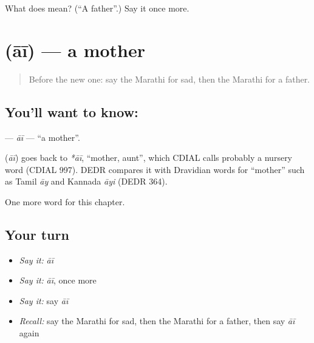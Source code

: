 \begin{tcolorbox}[breakable,colback=teal!4,colframe=teal!35!black,title={Before you move on}]
What does  mean? (\textquotedblleft{}A father\textquotedblright{}.) Say it once more.
\end{tcolorbox}
\section[\texorpdfstring{\mr{आई} (āī)}{आई (āī)}]{ (āī) — a mother}

\label{lesson:MR-C74-ai}



\begin{quote}
Before the new one: say the Marathi for sad, then the Marathi for a father.
\end{quote}

\subsection*{You'll want to know: }
\textbf{} — \emph{āī} — \textquotedblleft{}a mother\textquotedblright{}.

\begin{cousinweb}
\textbf{} (\emph{āī}) goes back to \emph{*āī}, \textquotedblleft{}mother, aunt\textquotedblright{}, which CDIAL calls probably a nursery word (CDIAL 997). DEDR compares it with Dravidian words for \textquotedblleft{}mother\textquotedblright{} such as Tamil \emph{āy} and Kannada \emph{āyi} (DEDR 364).
\end{cousinweb}

\begin{grammarlens}[title={What you've built}]
One more word for this chapter.
\end{grammarlens}

\subsection*{Your turn}
\begin{itemize}
\raggedright
  \item \emph{Say it:} \emph{āī}
  \item \emph{Say it:} \emph{āī}, once more
  \item \emph{Say it:} say \emph{āī}
  \item \emph{Recall:} say the Marathi for sad, then the Marathi for a father, then say \emph{āī} again
\end{itemize}

